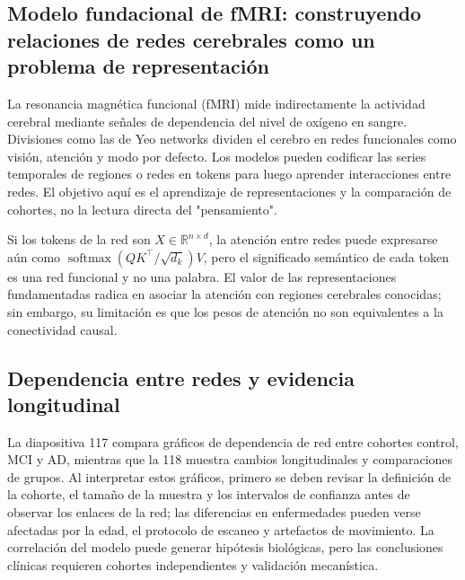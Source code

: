 \subsection{Modelo fundacional de fMRI: construyendo relaciones de redes cerebrales como un problema de representación}

La resonancia magnética funcional (fMRI) mide indirectamente la actividad cerebral mediante señales de dependencia del nivel de oxígeno en sangre. Divisiones como las de Yeo networks dividen el cerebro en redes funcionales como visión, atención y modo por defecto. Los modelos pueden codificar las series temporales de regiones o redes en tokens para luego aprender interacciones entre redes. El objetivo aquí es el aprendizaje de representaciones y la comparación de cohortes, no la lectura directa del "pensamiento".



Si los tokens de la red son $X\in\mathbb{R}^{n\times d}$, la atención entre redes puede expresarse aún como $\operatorname{softmax}(QK^\top/\sqrt{d_k})V$, pero el significado semántico de cada token es una red funcional y no una palabra. El valor de las representaciones fundamentadas radica en asociar la atención con regiones cerebrales conocidas; sin embargo, su limitación es que los pesos de atención no son equivalentes a la conectividad causal.

\subsection{Dependencia entre redes y evidencia longitudinal}

La diapositiva 117 compara gráficos de dependencia de red entre cohortes control, MCI y AD, mientras que la 118 muestra cambios longitudinales y comparaciones de grupos. Al interpretar estos gráficos, primero se deben revisar la definición de la cohorte, el tamaño de la muestra y los intervalos de confianza antes de observar los enlaces de la red; las diferencias en enfermedades pueden verse afectadas por la edad, el protocolo de escaneo y artefactos de movimiento. La correlación del modelo puede generar hipótesis biológicas, pero las conclusiones clínicas requieren cohortes independientes y validación mecanística.

